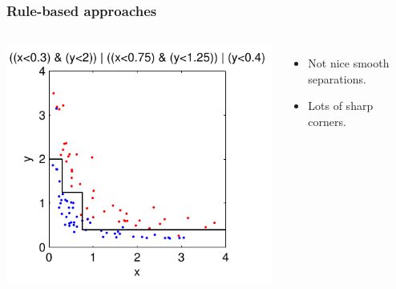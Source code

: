 \documentclass{beamer}
\begin{document}
\begin{frame}
\frametitle{Rule-based approaches}
\begin{columns}[c]
\includegraphics[width=\textwidth]{rule_based}
\begin{itemize}
\item Not nice smooth separations.
\item Lots of sharp corners.
\end{itemize}
\end{columns}
\end{frame}
\end{document}
